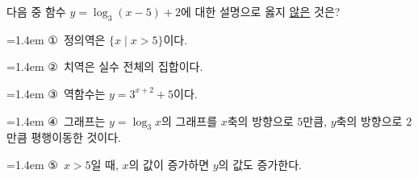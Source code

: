 다음 중 함수 $y=\log_3 (x-5)+2$에 대한 설명으로 옳지 \underline{않은} 것은?
\par\medskip\par\noindent\hangindent=1.4em {\small ①}\ 정의역은 $\{x \mid x>5\}$이다.\par\noindent\hangindent=1.4em {\small ②}\ 치역은 실수 전체의 집합이다.\par\noindent\hangindent=1.4em {\small ③}\ 역함수는 $y=3^{x+2}+5$이다.\par\noindent\hangindent=1.4em {\small ④}\ 그래프는 $y=\log_3 x$의 그래프를 $x$축의 방향으로 $5$만큼, $y$축의 방향으로 $2$만큼 평행이동한 것이다.\par\noindent\hangindent=1.4em {\small ⑤}\ $x>5$일 때, $x$의 값이 증가하면 $y$의 값도 증가한다.\par\medskip
